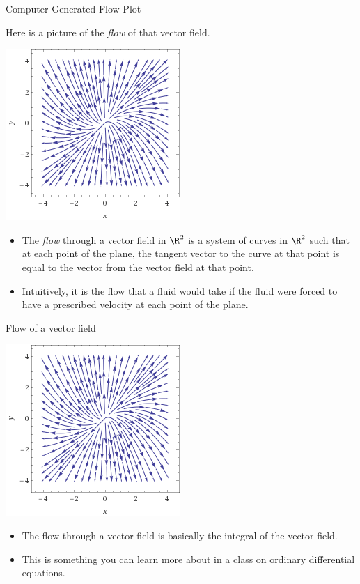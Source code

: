 \documentclass{beamer}
\begin{document}
\begin{frame}{Computer Generated Flow Plot}

Here is a picture of the \emph{flow} of that vector field.

\pause

\begin{center}
\includegraphics[scale=0.45]{stream1}
\end{center}

\pause

\begin{itemize}
\item The \emph{flow} through a vector field in $\R^2$ is a system of curves
in $\R^2$ such that at each point of the plane, the tangent vector to the
curve at that point is equal to the vector from the vector field at that point.
\item Intuitively, it is the flow that a fluid would take if the fluid were forced
to have a prescribed velocity at each point of the plane.
\end{itemize}
\end{frame}


\begin{frame}{Flow of a vector field}


\begin{center}
\includegraphics[scale=0.45]{stream1}
\end{center}

\begin{itemize}
\item The flow through a vector field is basically the integral of the vector field.
\item This is something you can learn more about in a class on ordinary differential equations.
\end{itemize}
\end{frame}
\end{document}
